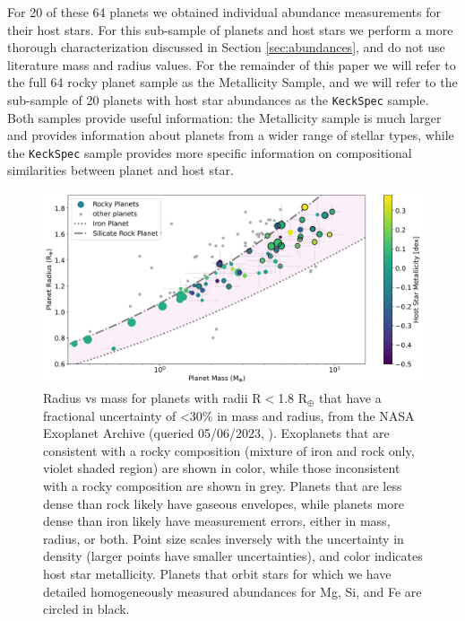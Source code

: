 \documentclass[twocolumn]{aastex631}
\begin{document}
For 20 of these 64 planets we obtained individual abundance measurements for their host stars. For this sub-sample of planets and host stars we perform a more thorough characterization discussed in Section \ref{sec:abundances}, and do not use literature mass and radius values. For the remainder of this paper we will refer to the full 64 rocky planet sample as the Metallicity Sample, and we will refer to the sub-sample of 20 planets with host star abundances as the \texttt{KeckSpec} sample. Both samples provide useful information: the Metallicity sample is much larger and provides information about planets from a wider range of stellar types, while the \texttt{KeckSpec} sample provides more specific information on compositional similarities between planet and host star. 


 \begin{figure}
    \centering
    \includegraphics[width=1.0\textwidth]{Planet_sample.png}
   
    \caption{Radius vs mass for planets with radii R$<$1.8  R$_{\oplus}$ that have a fractional uncertainty of <30$\%$ in mass and radius, from the NASA Exoplanet Archive (queried 05/06/2023, \citealt{2013PASP..125..989A}). Exoplanets that are consistent with a rocky composition (mixture of iron and rock only, violet shaded region) are shown in color, while those inconsistent with a rocky composition are shown in grey. Planets that are less dense than rock likely have gaseous envelopes, while planets more dense than iron likely have measurement errors, either in mass, radius, or both. Point size scales inversely with the uncertainty in density (larger points have smaller uncertainties), and color indicates host star metallicity. Planets that orbit stars for which we have detailed homogeneously measured abundances for Mg, Si, and Fe are circled in black.}
    \label{fig:massRadius}
\end{figure}
\end{document}
